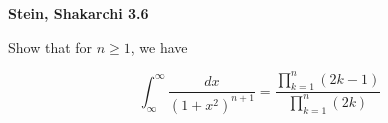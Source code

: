 \textbf{Stein, Shakarchi 3.6}

Show that for $n \ge 1$, we have

$$
  \int_{\infty}^{\infty} {\frac{dx}{\left( 1 + x^2 \right)^{n+1}}} = \frac{\prod\limits_{k=1}^{n} (2k - 1)}{\prod\limits_{k=1}^{n} (2k)}
$$

\begin{solution}
  \ \\
\end{solution}